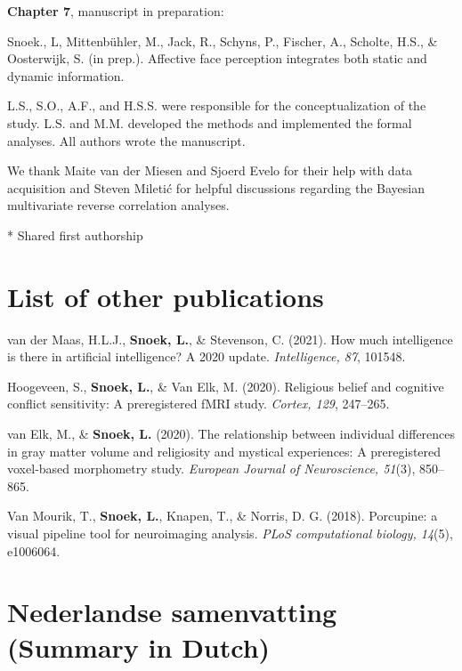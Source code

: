 \documentclass[11pt,american,a4paper,oneside,]{memoir} %
\begin{document}
\textbf{Chapter 7}, manuscript in preparation:

Snoek., L, Mittenbühler, M., Jack, R., Schyns, P., Fischer, A., Scholte, H.S., \& Oosterwijk, S. (in prep.). Affective face perception integrates both static and dynamic information.

L.S., S.O., A.F., and H.S.S. were responsible for the conceptualization of the study. L.S. and M.M. developed the methods and implemented the formal analyses. All authors wrote the manuscript.

We thank Maite van der Miesen and Sjoerd Evelo for their help with data acquisition and Steven Miletić for helpful discussions regarding the Bayesian multivariate reverse correlation analyses.

* Shared first authorship

\hypertarget{list-of-other-publications}{%
\chapter*{List of other publications}\label{list-of-other-publications}}


van der Maas, H.L.J., \textbf{Snoek, L.}, \& Stevenson, C. (2021). How much intelligence is there in artificial intelligence? A 2020 update. \emph{Intelligence, 87}, 101548.\newline

Hoogeveen, S., \textbf{Snoek, L.}, \& Van Elk, M. (2020). Religious belief and cognitive conflict sensitivity: A preregistered fMRI study. \emph{Cortex, 129}, 247--265.\newline

van Elk, M., \& \textbf{Snoek, L.} (2020). The relationship between individual differences in gray matter volume and religiosity and mystical experiences: A preregistered voxel‐based morphometry study. \emph{European Journal of Neuroscience, 51}(3), 850--865.\newline

Van Mourik, T., \textbf{Snoek, L.}, Knapen, T., \& Norris, D. G. (2018). Porcupine: a visual pipeline tool for neuroimaging analysis. \emph{PLoS computational biology, 14}(5), e1006064.\newline

\normalsize
\setlength{\parindent}{1.5em}

\hypertarget{nederlandse-samenvatting-summary-in-dutch}{%
\chapter*{Nederlandse samenvatting (Summary in Dutch)}\label{nederlandse-samenvatting-summary-in-dutch}}
\end{document}
